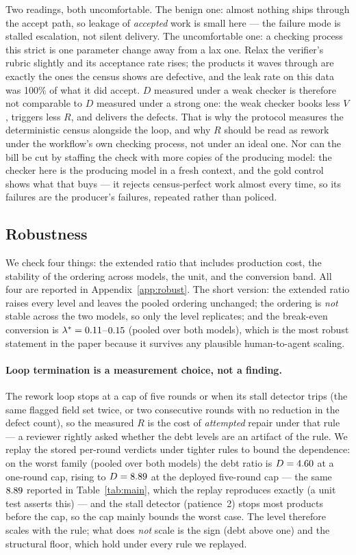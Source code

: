 \documentclass[11pt]{article}
\newcommand{\D}{\ensuremath{D}}
\newcommand{\VV}{\ensuremath{V}}
\newcommand{\RV}{\ensuremath{R}}
\begin{document}
Two readings, both uncomfortable. The benign one: almost nothing ships through the accept path,
so leakage of \emph{accepted} work is small here --- the failure mode is stalled escalation, not
silent delivery. The uncomfortable one: a checking process this strict is one parameter change
away from a lax one. Relax the verifier's rubric slightly and its acceptance rate rises; the
products it waves through are exactly the ones the census shows are defective, and the leak rate
on this data was 100\% of what it did accept. $\D$ measured under a weak checker is therefore
not comparable to $\D$ measured under a strong one: the weak checker books less $\VV$, triggers
less $\RV$, and delivers the defects. That is why the protocol measures the deterministic census
alongside the loop, and why $\RV$ should be read as rework under the workflow's own checking
process, not under an ideal one. Nor can the bill be cut by staffing the check with more copies
of the producing model: the checker here is the producing model in a fresh context, and the
gold control shows what that buys --- it rejects census-perfect work almost every time, so its
failures are the producer's failures, repeated rather than policed.

\subsection{Robustness}
\label{sec:robust}

We check four things: the extended ratio that includes production cost, the stability of the
ordering across models, the unit, and the conversion band. All four are reported in
Appendix~\ref{app:robust}. The short version: the extended ratio raises every level and leaves the
pooled ordering unchanged; the ordering is \emph{not} stable across the two models, so only the
level replicates; and the break-even conversion is
$\lambda^{*}=0.11$--$0.15$ (pooled over both models), which is the most
robust statement in the paper because it survives any plausible human-to-agent scaling.

\paragraph{Loop termination is a measurement choice, not a finding.} The rework loop stops at a
cap of five rounds or when its stall detector trips (the same flagged field set twice, or two
consecutive rounds with no reduction in the defect count), so the measured $\RV$ is the cost of
\emph{attempted} repair under that rule --- a reviewer rightly asked whether the debt levels are an
artifact of the rule. We replay the stored per-round verdicts under tighter rules to bound the
dependence: on the worst family (pooled over both models) the debt ratio is $\D=\VDtermCapA$ at a
one-round cap, rising to $\D=\VDtermCapE$ at the deployed five-round cap --- the same
$8.89$ reported in Table~\ref{tab:main}, which the replay reproduces exactly (a unit test
asserts this) --- and the stall detector (patience~2) stops most products before the cap, so the cap
mainly bounds the worst case. The level therefore scales with the rule; what does \emph{not} scale is
the sign (debt above one) and the structural floor, which hold under every rule we replayed.
\end{document}
